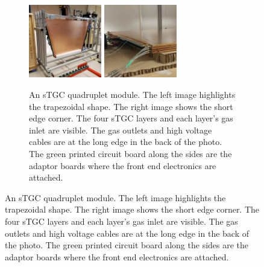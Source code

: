\newpage
\thispagestyle{empty}
\begin{figure}
\centering
\begin{subfigure}{\textwidth}
  \centering
  \includegraphics[width=0.35\textwidth]{figures/stgc_quad_cart.jpg}
  \includegraphics[width=0.35\textwidth]{figures/stgc_quad_inlet_corner.jpg}
  \caption{An sTGC quadruplet module. The left image highlights the trapezoidal shape. The right image shows the short edge corner. The four sTGC layers and each layer's gas inlet are visible. The gas outlets and high voltage cables are at the long edge in the back of the photo. The green printed circuit board along the sides are the adaptor boards where the front end electronics are attached.}
  \label{fig:stgc_quad}
\end{subfigure}

\smallskip


\end{figure}
